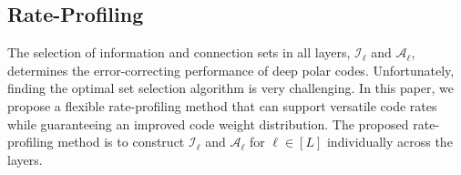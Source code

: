 \documentclass[conference]{IEEEtran}
\begin{document}
%
%




 
	 
\subsection{Rate-Profiling}
The selection of information and connection sets in all layers, $\mathcal{I}_{\ell}$ and $\mathcal{A}_{\ell}$, determines the error-correcting performance of deep polar codes. Unfortunately, finding the optimal set selection algorithm is very challenging. In this paper, we propose a flexible rate-profiling method that can support versatile code rates while guaranteeing an improved code weight distribution. The proposed rate-profiling method is to construct $\mathcal{I}_{\ell}$ and $\mathcal{A}_{\ell}$ for $\ell\in [L]$ individually across the layers. 
\end{document}
